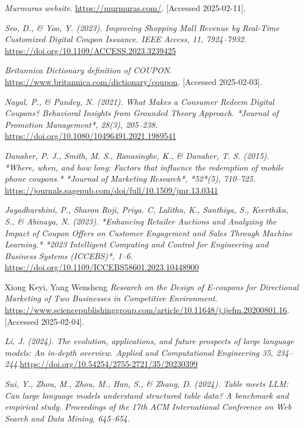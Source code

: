 \documentclass[licencjacka,en]{pracamgr}
\begin{document}
\begin{thebibliography}{99}

\raggedright

\textit{Murmuras website}.  
\url{https://murmuras.com/}.  
[Accessed 2025-02-11].

\textit{Seo, D., \& Yoo, Y. (2023). Improving Shopping Mall Revenue by Real-Time Customized Digital Coupon Issuance. IEEE Access, 11, 7924–7932.}
\url{https://doi.org/10.1109/ACCESS.2023.3239425}

\textit{Britannica Dictionary definition of COUPON}.
\url{https://www.britannica.com/dictionary/coupon}.
[Accessed 2025-02-03].

\textit{Nayal, P., \& Pandey, N. (2021). What Makes a Consumer Redeem Digital Coupons? Behavioral Insights from Grounded Theory Approach. *Journal of Promotion Management*, 28(3), 205–238.}
\url{https://doi.org/10.1080/10496491.2021.1989541}

\textit{Danaher, P. J., Smith, M. S., Ranasinghe, K., \& Danaher, T. S. (2015). *Where, when, and how long: Factors that influence the redemption of mobile phone coupons.* *Journal of Marketing Research*, *52*(5), 710--725.}
\url{https://journals.sagepub.com/doi/full/10.1509/jmr.13.0341}

\textit{Jayadharshini, P., Sharon Roji, Priya. C, Lalitha, K., Santhiya, S., Keerthika, S., \& Abinaya, N. (2023). *Enhancing Retailer Auctions and Analyzing the Impact of Coupon Offers on Customer Engagement and Sales Through Machine Learning.* *2023 Intelligent Computing and Control for Engineering and Business Systems (ICCEBS)*, 1–6. }
\url{https://doi.org/10.1109/ICCEBS58601.2023.10448900}

Xiong Keyi, Yang Wensheng
\textit{Research on the Design of E-coupons for Directional Marketing of Two Businesses in Competitive Environment}.
\url{https://www.sciencepublishinggroup.com/article/10.11648/j.ijefm.20200801.16}.
[Accessed 2025-02-04].

\textit{Li, J. (2024). The evolution, applications, and future prospects of large language models: An in-depth overview. Applied and Computational Engineering 35, 234–244.}\url{https://doi.org/10.54254/2755-2721/35/20230399}

\textit{Sui, Y., Zhou, M., Zhou, M., Han, S., \& Zhang, D. (2024). Table meets LLM: Can large language models understand structured table data? A benchmark and empirical study. Proceedings of the 17th ACM International Conference on Web Search and Data Mining, 645--654.}


\end{thebibliography}
\end{document}
